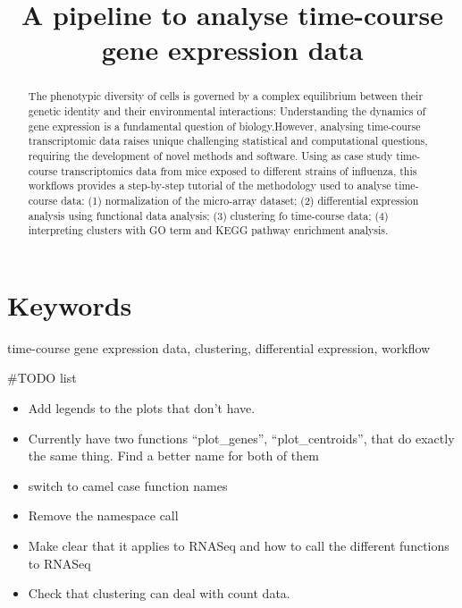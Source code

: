 \documentclass[9pt,a4paper,]{extarticle}
\begin{document}
\pagestyle{front}

\title{A pipeline to analyse time-course gene expression data}


\maketitle
\thispagestyle{front}

\begin{abstract}
The phenotypic diversity of cells is governed by a complex equilibrium between their genetic identity and their environmental interactions: Understanding the dynamics of gene expression is a fundamental question of biology.However, analysing time-course transcriptomic data raises unique challenging statistical and computational questions, requiring the development of novel methods and software. Using as case study time-course transcriptomics data from mice exposed to different strains of influenza, this workflows provides a step-by-step tutorial of the methodology used to analyse time-course data: (1) normalization of the micro-array dataset; (2) differential expression analysis using functional data analysis; (3) clustering fo time-course data; (4) interpreting clusters with GO term and KEGG pathway enrichment analysis.
\end{abstract}

\section*{Keywords}
time-course gene expression data, clustering, differential expression, workflow


\clearpage
\pagestyle{main}

\#TODO list

\begin{itemize}
\tightlist
\item
  Add legends to the plots that don't have.
\item
  Currently have two functions ``plot\_genes'', ``plot\_centroids'', that do exactly
  the same thing. Find a better name for both of them
\item
  switch to camel case function names
\item
  Remove the namespace call
\item
  Make clear that it applies to RNASeq and how to call the different functions
  to RNASeq
\item
  Check that clustering can deal with count data.
\end{itemize}
\end{document}
